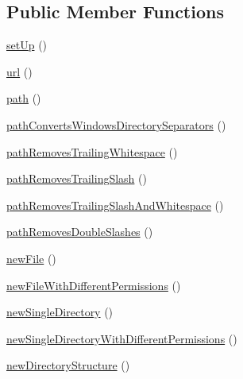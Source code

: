 \subsection*{Public Member Functions}
\begin{DoxyCompactItemize}
\item 
\mbox{\hyperlink{classorg_1_1bovigo_1_1vfs_1_1vfs_stream_test_case_a0bc688732d2b3b162ffebaf7812e78da}{set\+Up}} ()
\item 
\mbox{\hyperlink{classorg_1_1bovigo_1_1vfs_1_1vfs_stream_test_case_abc5ed2ad3f9365fb31cc1eb625b974d9}{url}} ()
\item 
\mbox{\hyperlink{classorg_1_1bovigo_1_1vfs_1_1vfs_stream_test_case_a3b05eec13add53df44e232273d718ae4}{path}} ()
\item 
\mbox{\hyperlink{classorg_1_1bovigo_1_1vfs_1_1vfs_stream_test_case_a3b912c62c684a374f0f9daba61fe147e}{path\+Converts\+Windows\+Directory\+Separators}} ()
\item 
\mbox{\hyperlink{classorg_1_1bovigo_1_1vfs_1_1vfs_stream_test_case_a2c5d48bf7957c64e5462313a7bc7e2df}{path\+Removes\+Trailing\+Whitespace}} ()
\item 
\mbox{\hyperlink{classorg_1_1bovigo_1_1vfs_1_1vfs_stream_test_case_a28ed4120628747a81f693fb7e2705a49}{path\+Removes\+Trailing\+Slash}} ()
\item 
\mbox{\hyperlink{classorg_1_1bovigo_1_1vfs_1_1vfs_stream_test_case_a9008fed86de65f7129a56ec2b70ce3fe}{path\+Removes\+Trailing\+Slash\+And\+Whitespace}} ()
\item 
\mbox{\hyperlink{classorg_1_1bovigo_1_1vfs_1_1vfs_stream_test_case_a7c67030100c351f5fb7b1eed3892fc87}{path\+Removes\+Double\+Slashes}} ()
\item 
\mbox{\hyperlink{classorg_1_1bovigo_1_1vfs_1_1vfs_stream_test_case_a99ca83f439ba5427ad4937a9cfdefca6}{new\+File}} ()
\item 
\mbox{\hyperlink{classorg_1_1bovigo_1_1vfs_1_1vfs_stream_test_case_ae593bb306762678ec4834a8f0c4a0055}{new\+File\+With\+Different\+Permissions}} ()
\item 
\mbox{\hyperlink{classorg_1_1bovigo_1_1vfs_1_1vfs_stream_test_case_a5fc08e20abf4cfd02ad357e134410301}{new\+Single\+Directory}} ()
\item 
\mbox{\hyperlink{classorg_1_1bovigo_1_1vfs_1_1vfs_stream_test_case_a5ea1c242daa3fe320fedab5e952b0b4f}{new\+Single\+Directory\+With\+Different\+Permissions}} ()
\item 
\mbox{\hyperlink{classorg_1_1bovigo_1_1vfs_1_1vfs_stream_test_case_a9745342411bd72de91d3ab2c819c566f}{new\+Directory\+Structure}} ()

\end{DoxyCompactItemize}
